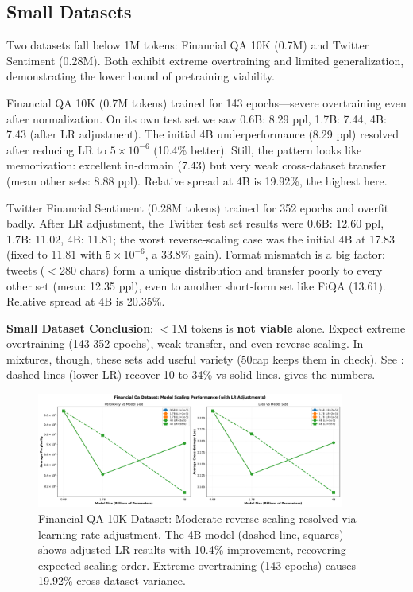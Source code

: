 





\subsection{Small Datasets}

Two datasets fall below 1M tokens: Financial QA 10K (0.7M) and Twitter Sentiment (0.28M). Both exhibit extreme overtraining and limited generalization, demonstrating the lower bound of pretraining viability.

Financial QA 10K (0.7M tokens) trained for 143 epochs—severe overtraining even after normalization. On its own test set we saw 0.6B: 8.29 ppl, 1.7B: 7.44, 4B: 7.43 (after LR adjustment). The initial 4B underperformance (8.29 ppl) resolved after reducing LR to $5\times10^{-6}$ (10.4\% better). Still, the pattern looks like memorization: excellent in‑domain (7.43) but very weak cross‑dataset transfer (mean other sets: 8.88 ppl). Relative spread at 4B is 19.92\%, the highest here.

Twitter Financial Sentiment (0.28M tokens) trained for 352 epochs and overfit badly. After LR adjustment, the Twitter test set results were 0.6B: 12.60 ppl, 1.7B: 11.02, 4B: 11.81; the worst reverse‑scaling case was the initial 4B at 17.83 (fixed to 11.81 with $5\times10^{-6}$, a 33.8\% gain). Format mismatch is a big factor: tweets ($<$280 chars) form a unique distribution and transfer poorly to every other set (mean: 12.35 ppl), even to another short‑form set like FiQA (13.61). Relative spread at 4B is 20.35\%.

\textbf{Small Dataset Conclusion}: $<$1M tokens is \textbf{not viable} alone. Expect extreme overtraining (143-352 epochs), weak transfer, and even reverse scaling. In mixtures, though, these sets add useful variety (50cap keeps them in check). See : dashed lines (lower LR) recover 10 to 34\% vs solid lines.  gives the numbers.

\begin{figure}[htbp]
\centering
\includegraphics[width=0.9\textwidth]{figures/scaling_financial_qa.png}
\caption[Financial QA 10K Dataset: Reverse Scaling]{Financial QA 10K Dataset: Moderate reverse scaling resolved via learning rate adjustment. The 4B model (dashed line, squares) shows adjusted LR results with 10.4\% improvement, recovering expected scaling order. Extreme overtraining (143 epochs) causes 19.92\% cross-dataset variance.}
\label{fig:scaling_financial_qa}
\end{figure}

